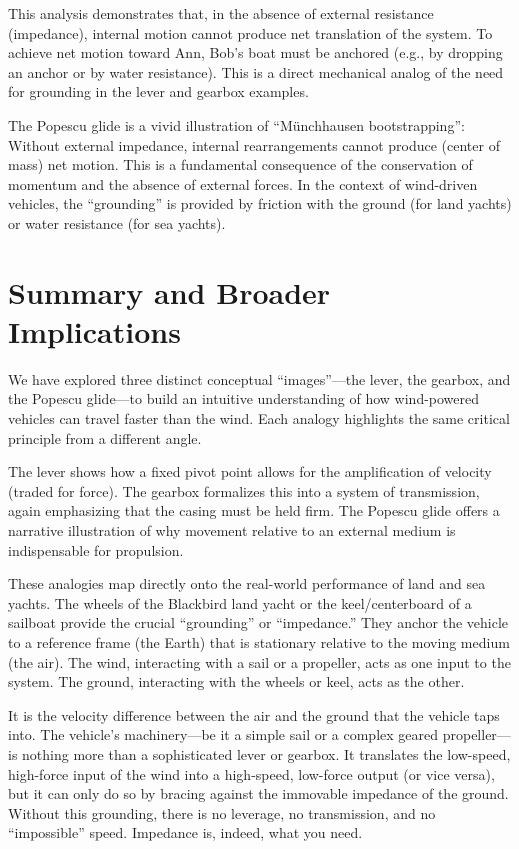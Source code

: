 \documentclass[reprint,aps,pra,superscriptaddress,longbibliography]{revtex4-2}
\begin{document}
This analysis demonstrates that, in the absence of external resistance (impedance), internal motion cannot produce net translation of the system. To achieve net motion toward Ann, Bob's boat must be anchored (e.g., by dropping an anchor or by water resistance). This is a direct mechanical analog of the need for grounding in the lever and gearbox examples.

The Popescu glide is a vivid illustration of  ``M\"unchhausen bootstrapping'': Without external impedance, internal rearrangements cannot produce (center of mass) net motion. This is a fundamental consequence of the conservation of momentum and the absence of external forces. In the context of wind-driven vehicles, the ``grounding'' is provided by friction with the ground (for land yachts) or water resistance (for sea yachts).

\section{Summary and Broader Implications}

We have explored three distinct conceptual ``images''---the lever, the gearbox, and the Popescu glide---to build an intuitive understanding of how wind-powered vehicles can travel faster than the wind. Each analogy highlights the same critical principle from a different angle.

The lever shows how a fixed pivot point allows for the amplification of velocity (traded for force). The gearbox formalizes this into a system of transmission, again emphasizing that the casing must be held firm. The Popescu glide offers a narrative illustration of why movement relative to an external medium is indispensable for propulsion.

These analogies map directly onto the real-world performance of land and sea yachts. The wheels of the Blackbird land yacht or the keel/centerboard of a sailboat provide the crucial ``grounding'' or ``impedance.'' They anchor the vehicle to a reference frame (the Earth) that is stationary relative to the moving medium (the air). The wind, interacting with a sail or a propeller, acts as one input to the system. The ground, interacting with the wheels or keel, acts as the other.

It is the velocity difference between the air and the ground that the vehicle taps into. The vehicle's machinery---be it a simple sail or a complex geared propeller---is nothing more than a sophisticated lever or gearbox. It translates the low-speed, high-force input of the wind into a high-speed, low-force output (or vice versa), but it can only do so by bracing against the immovable impedance of the ground. Without this grounding, there is no leverage, no transmission, and no ``impossible'' speed.
Impedance is, indeed, what you need.
\end{document}
